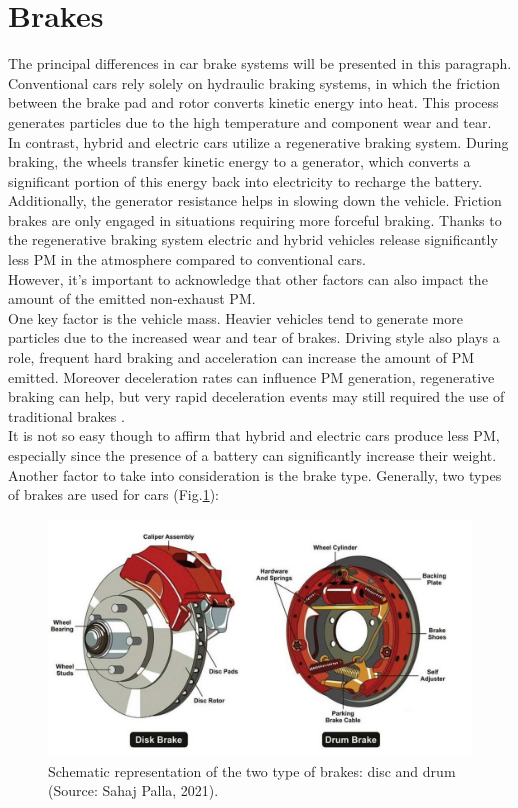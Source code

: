 \section{Brakes}
The principal differences in car brake systems will be presented in this paragraph. \\
Conventional cars rely solely on hydraulic braking systems, in which the friction between the brake pad and rotor converts kinetic energy into heat. This process generates particles due to the high temperature and component wear and tear. \\
In contrast, hybrid and electric cars utilize a regenerative braking system. During braking, the wheels transfer kinetic energy to a generator, which converts a significant portion of this energy back into electricity to recharge the battery.\\ Additionally, the generator resistance helps in slowing down the vehicle. Friction brakes are only engaged in situations requiring more forceful braking.
Thanks to the regenerative braking system electric and hybrid vehicles release significantly less PM in the atmosphere compared to conventional cars. \\
However, it’s important to acknowledge that other factors can also impact the amount of the emitted non-exhaust PM. \\
One key factor is the vehicle mass. Heavier vehicles tend to generate more particles due to the increased wear and tear of brakes. Driving style also plays a role, frequent hard braking and acceleration can increase the amount of PM emitted. Moreover deceleration rates can influence PM generation, regenerative braking can help, but very rapid deceleration events may still required the use of traditional brakes \cite{hicks2023quantifying}. \\
It is not so easy though to affirm that hybrid and electric cars produce less PM, especially since the presence of a battery can significantly increase their weight. \\
Another factor to take into consideration is the brake type. Generally, two types of brakes are used for cars (Fig.\ref{fig:brakes}):

\begin{figure}[H]
\centering
    \includegraphics[scale=0.20]{images/brakes.jpg}
    \caption{Schematic representation of the two type of brakes: disc and drum (Source: Sahaj Palla, 2021).
}
    \label{fig:brakes}
\end{figure}


